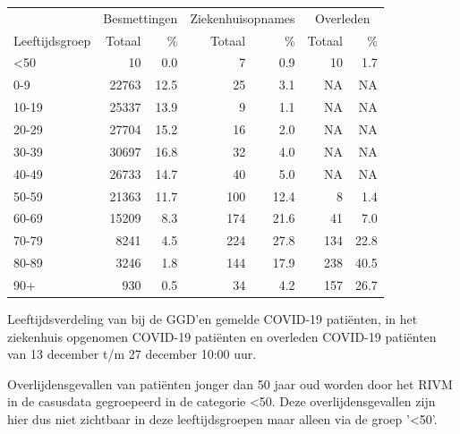 \documentclass[
  english,
  man,floatsintext]{apa6}
\begin{document}
\begin{table}
\centering\begingroup\fontsize{11}{13}\selectfont

\begin{threeparttable}
\begin{tabular}{lrrrrrr}
\toprule
\multicolumn{1}{c}{ } & \multicolumn{2}{c}{Besmettingen} & \multicolumn{2}{c}{Ziekenhuisopnames} & \multicolumn{2}{c}{Overleden} \\
\cmidrule(l{3pt}r{3pt}){2-3} \cmidrule(l{3pt}r{3pt}){4-5} \cmidrule(l{3pt}r{3pt}){6-7}
Leeftijdsgroep & Totaal & \% & Totaal & \% & Totaal & \%\\
\midrule
<50 & 10 & 0.0 & 7 & 0.9 & 10 & 1.7\\
0-9 & 22763 & 12.5 & 25 & 3.1 & NA & NA\\
10-19 & 25337 & 13.9 & 9 & 1.1 & NA & NA\\
20-29 & 27704 & 15.2 & 16 & 2.0 & NA & NA\\
30-39 & 30697 & 16.8 & 32 & 4.0 & NA & NA\\
40-49 & 26733 & 14.7 & 40 & 5.0 & NA & NA\\
50-59 & 21363 & 11.7 & 100 & 12.4 & 8 & 1.4\\
60-69 & 15209 & 8.3 & 174 & 21.6 & 41 & 7.0\\
70-79 & 8241 & 4.5 & 224 & 27.8 & 134 & 22.8\\
80-89 & 3246 & 1.8 & 144 & 17.9 & 238 & 40.5\\
90+ & 930 & 0.5 & 34 & 4.2 & 157 & 26.7\\
\bottomrule
\end{tabular}
\begin{tablenotes}
\item[1] Leeftijdsverdeling van bij de GGD’en gemelde COVID-19 patiënten, in het ziekenhuis opgenomen COVID-19 patiënten en overleden COVID-19 patiënten van 13 december t/m 27 december 10:00 uur.
\item[2] Overlijdensgevallen van patiënten jonger dan 50 jaar oud worden door het RIVM in de casusdata gegroepeerd in de categorie <50. Deze overlijdensgevallen zijn hier dus niet zichtbaar in deze leeftijdsgroepen maar alleen via de groep '<50'.
\end{tablenotes}
\end{threeparttable}
\endgroup{}
\end{table}

\newpage
\end{document}
